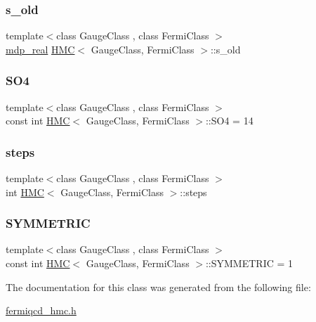 \mbox{\label{class_h_m_c_a54ce598a989a71f3bfbb58057dcea2ed}} 
\subsubsection{\texorpdfstring{s\+\_\+old}{s\_old}}
{\footnotesize\ttfamily template$<$class Gauge\+Class , class Fermi\+Class $>$ \\
\hyperlink{mdp__global__vars_8h_a69d96b74c791e0bbdb888b3913a69450}{mdp\+\_\+real} \hyperlink{class_h_m_c}{H\+MC}$<$ Gauge\+Class, Fermi\+Class $>$\+::s\+\_\+old}

\mbox{\label{class_h_m_c_ab0bf3c86c692d5f68a0ef2d069f0caf5}} 
\subsubsection{\texorpdfstring{S\+O4}{SO4}}
{\footnotesize\ttfamily template$<$class Gauge\+Class , class Fermi\+Class $>$ \\
const int \hyperlink{class_h_m_c}{H\+MC}$<$ Gauge\+Class, Fermi\+Class $>$\+::S\+O4 = 14\hspace{0.3cm}{\ttfamily [static]}}

\mbox{\label{class_h_m_c_a0254c831e713cdad8e2bbec4c247c045}} 
\subsubsection{\texorpdfstring{steps}{steps}}
{\footnotesize\ttfamily template$<$class Gauge\+Class , class Fermi\+Class $>$ \\
int \hyperlink{class_h_m_c}{H\+MC}$<$ Gauge\+Class, Fermi\+Class $>$\+::steps}

\mbox{\label{class_h_m_c_adf96eacce9b78dfd329076b35b8544f5}} 
\subsubsection{\texorpdfstring{S\+Y\+M\+M\+E\+T\+R\+IC}{SYMMETRIC}}
{\footnotesize\ttfamily template$<$class Gauge\+Class , class Fermi\+Class $>$ \\
const int \hyperlink{class_h_m_c}{H\+MC}$<$ Gauge\+Class, Fermi\+Class $>$\+::S\+Y\+M\+M\+E\+T\+R\+IC = 1\hspace{0.3cm}{\ttfamily [static]}}



The documentation for this class was generated from the following file\+:\begin{DoxyCompactItemize}
\item 
\hyperlink{fermiqcd__hmc_8h}{fermiqcd\+\_\+hmc.\+h}\end{DoxyCompactItemize}
